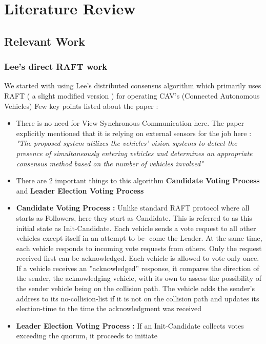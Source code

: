 \documentclass[fleqn,10pt]{olplainarticle}
\begin{document}
\section{Literature Review}
\subsection{Relevant Work}
\subsubsection{Lee's direct RAFT work}
   We started with using Lee's distributed consensus algorithm which primarily uses RAFT ( a slight modified version ) for operating CAV's (Connected Autonomous Vehicles) \cite{lee2025distributed}
   Few key points listed about the paper :
   \begin{itemize}
       \item There is no need for View Synchronous Communication here. The paper explicitly mentioned that it is relying on external sensors for the job here : \textit{"The proposed system utilizes the vehicles’ vision systems to detect the presence of simultaneously entering vehicles and determines an appropriate consensus method based on the number of vehicles involved"}
       \item There are 2 important things to this algorithm \textbf{Candidate Voting Process} and \textbf{Leader Election Voting Process}
       \item \textbf{Candidate Voting Process : } Unlike standard RAFT protocol where all starts as Followers, here they start as Candidate. This is referred to as this initial state as Init-Candidate. Each vehicle sends a vote
        request to all other vehicles except itself in an attempt to be-
        come the Leader. At the same time, each vehicle responds to
        incoming vote requests from others. Only the request received
        first can be acknowledged. Each vehicle is allowed to vote
        only once. If a vehicle receives an ”acknowledged” response,
        it compares the direction of the sender, the acknowledging
        vehicle, with its own to assess the possibility of the sender
        vehicle being on the collision path. The vehicle adds the
        sender’s address to its no-collision-list if it is not on the
        collision path and updates its election-time to the time the
        acknowledgment was received
       \item \textbf{Leader Election Voting Process : } If an Init-Candidate
collects votes exceeding the quorum, it proceeds to initiate

\end{itemize}
\end{document}
